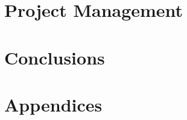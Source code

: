 \documentclass[11pt]{article}
\begin{document}
\clearpage
\section{Project Management}
\label{sec:project-management}


\clearpage
\section{Conclusions}
\label{sec:conclusions}


\newpage
\printbibliography[heading=bibintoc]

\newpage
\section{Appendices}
\label{sec:appendices}

\end{document}
